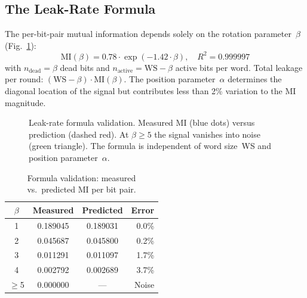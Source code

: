 \documentclass[conference,a4paper]{IEEEtran}
\begin{document}
\subsection{The Leak-Rate Formula}

The per-bit-pair mutual information depends solely on the rotation parameter~$\beta$ (Fig.~\ref{fig:formula}):
\begin{equation}
\mathrm{MI}(\beta) = 0.78 \cdot \exp(-1.42 \cdot \beta), \quad R^2 = 0.999997
\label{eq:formula}
\end{equation}
with $n_{\mathrm{dead}} = \beta$ dead bits and $n_{\mathrm{active}} = \mathrm{WS} - \beta$ active bits per word. Total leakage per round: $(\mathrm{WS} - \beta) \cdot \mathrm{MI}(\beta)$. The position parameter~$\alpha$ determines the diagonal location of the signal but contributes less than 2\% variation to the MI magnitude.

\begin{figure}[t]
\centering
{}
\caption{Leak-rate formula validation. Measured MI (blue dots) versus prediction (dashed red). At $\beta \geq 5$ the signal vanishes into noise (green triangle). The formula is independent of word size~WS and position parameter~$\alpha$.}
\label{fig:formula}
\end{figure}

\begin{table}[t]
\centering
\caption{Formula validation: measured vs.\ predicted MI per bit pair.}
\label{tab:formula}
\begin{tabular}{@{}cccr@{}}
\toprule
$\beta$ & \textbf{Measured} & \textbf{Predicted} & \textbf{Error} \\
\midrule
1 & 0.189045 & 0.189031 &  0.0\% \\
2 & 0.045687 & 0.045800 &  0.2\% \\
3 & 0.011291 & 0.011097 &  1.7\% \\
4 & 0.002792 & 0.002689 &  3.7\% \\
$\geq$5 & 0.000000 & --- & Noise \\
\bottomrule
\end{tabular}
\end{table}
\end{document}
